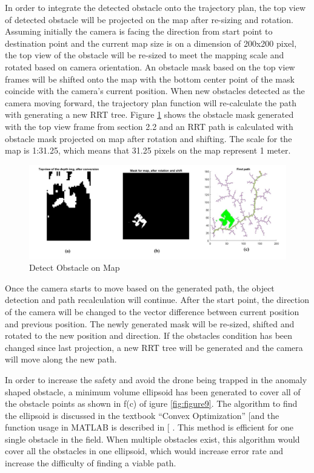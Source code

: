 \documentclass[
  oneside]{ubcthesis}
\begin{document}
In order to integrate the detected obstacle onto the trajectory plan, the top view of detected obstacle will be projected on the map after re-sizing and rotation. Assuming initially the camera is facing the direction from start point to destination point and the current map size is on a dimension of 200x200 pixel, the top view of the obstacle will be re-sized to meet the mapping scale and rotated based on camera orientation. An obstacle mask based on the top view frames will be shifted onto the map with the bottom center point of the mask coincide with the camera's current position. When new obstacles detected as the camera moving forward, the trajectory plan function will re-calculate the path with generating a new RRT tree. Figure \ref{fig:figure8} shows the obstacle mask generated with the top view frame from section 2.2 and an RRT path is calculated with obstacle mask projected on map after rotation and shifting. The scale for the map is 1:31.25, which means that 31.25 pixels on the map represent 1 meter.

\begin{figure}

{\centering \includegraphics[width=0.9\linewidth]{figures/8} 

}

\caption{Detect Obstacle on Map}\label{fig:figure8}
\end{figure}



Once the camera starts to move based on the generated path, the object detection and path recalculation will continue. After the start point, the direction of the camera will be changed to the vector difference between current position and previous position. The newly generated mask will be re-sized, shifted and rotated to the new position and direction. If the obstacles condition has been changed since last projection, a new RRT tree will be generated and the camera will move along the new path.

In order to increase the safety and avoid the drone being trapped in the anomaly shaped obstacle, a minimum volume ellipsoid has been generated to cover all of the obstacle points as shown in f(c) of igure \ref{fig:figure9}. The algorithm to find the ellipsoid is discussed in the textbook ``Convex Optimization'' {[}\citep{convexOpt}and the function usage in MATLAB is described in {[}\citep{miniEllipsoid} .
This method is efficient for one single obstacle in the field. When multiple obstacles exist, this algorithm would cover all the obstacles in one ellipsoid, which would increase error rate and increase the difficulty of finding a viable path.
\end{document}
